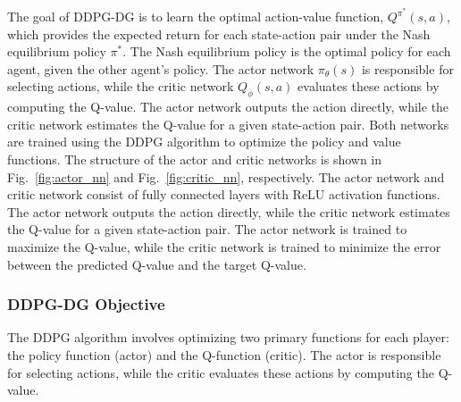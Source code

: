 \documentclass[conference]{IEEEtran}
\begin{document}
 The goal of DDPG-DG is to learn the optimal action-value function, \( Q^{\pi^*}(s, a) \), which provides the expected return for each state-action pair under the Nash equilibrium policy \( \pi^* \). The Nash equilibrium policy is the optimal policy for each agent, given the other agent's policy.
The actor network \( \pi_{\theta}(s) \) is responsible for selecting actions, while the critic network \( Q_{\phi}(s, a) \) evaluates these actions by computing the Q-value. The actor network outputs the action directly, while the critic network estimates the Q-value for a given state-action pair. Both networks are trained using the DDPG algorithm to optimize the policy and value functions.
The structure of the actor and critic networks is shown in Fig.~\ref{fig:actor_nn} and Fig.~\ref{fig:critic_nn}, respectively. The actor network and critic network consist of fully connected layers with ReLU activation functions. The actor network outputs the action directly, while the critic network estimates the Q-value for a given state-action pair. The actor network is trained to maximize the Q-value, while the critic network is trained to minimize the error between the predicted Q-value and the target Q-value.


\subsubsection{DDPG-DG Objective}

The DDPG algorithm involves optimizing two primary functions for each player: the policy function (actor) and the Q-function (critic). The actor is responsible for selecting actions, while the critic evaluates these actions by computing the Q-value.


\end{document}
